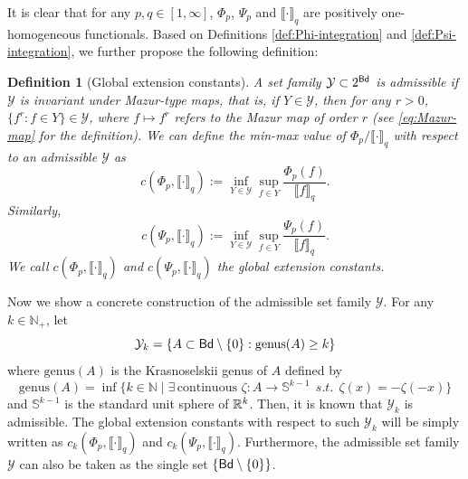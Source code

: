 \documentclass[12pt,a4paper]{article}
\newtheorem{defn}[theorem]{Definition}
\begin{document}
It is clear that for any $p,q\in[1,\infty]$, $\Phi_p$, $\Psi_p$ and $\llbracket \cdot\rrbracket_q$ are  positively one-homogeneous functionals. Based on Definitions \ref{def:Phi-integration} and \ref{def:Psi-integration}, we further propose the following definition: %
\begin{defn}[Global extension constants]
\label{def:global-extension-cons}
A set family $\mathcal{Y}\subset 2^{\sf Bd}$ is \emph{admissible} if $\mathcal{Y}$ is invariant under Mazur-type maps, that is, if $Y\in \mathcal{Y}$, then for any $r>0$, $\{f^r:f\in Y\}\in \mathcal{Y}$, where $f\mapsto f^r$ refers to the Mazur map of order $r$ (see \eqref{eq:Mazur-map} for the definition). 
We can define the %
\emph{min-max value} of $\Phi_p/\llbracket \cdot\rrbracket_q$ with respect to an admissible $\mathcal{Y}$ as 
$$ 
c
(\Phi_p,\llbracket \cdot\rrbracket_q):=\inf\limits_{Y\in \mathcal{Y}}\sup\limits_{f\in Y} \frac{\Phi_p(f)}{\big\llbracket f\big\rrbracket_q}.$$
Similarly, 
$$ 
c
(\Psi_p,\llbracket \cdot\rrbracket_q):=\inf\limits_{Y\in \mathcal{Y}}\sup\limits_{f\in Y} \frac{\Psi_p(f)}{\big\llbracket f\big\rrbracket_q}.$$
We %
call $c
(\Phi_p,\llbracket \cdot\rrbracket_q)$ and $c
(\Psi_p,\llbracket \cdot\rrbracket_q)$ the \emph{global extension constants}.

\end{defn}

Now we show a concrete construction of the admissible set family $\mathcal{Y}$. 
For any $k\in \mathbb{N}_+$, let 
\begin{equation}\label{eq:Y_k}
\mathcal{Y}_k=\{A\subset {\sf Bd}\setminus\{0\}:\mathrm{genus}(A)\ge k\}    
\end{equation}
where $\mathrm{genus}(A)$ is the Krasnoselskii genus of $A$ defined by 
%
\[
\mathrm{genus}(A)=%
\inf\big\{ k\in\mathbb{N}\;|\; \exists\,\text{continuous }\zeta:A\to \mathbb{S}^{k-1}\;\, s.t. \;\, \zeta(x)=-\zeta(-x)\big\rbrace  %
\]
and $\mathbb{S}^{k-1}$ is the standard unit sphere of $\mathbb{R}^k$. Then, it is known that $\mathcal{Y}_k$ is admissible. 
The global extension constants with respect to such $\mathcal{Y}_k$ will be simply written as $c_k
(\Phi_p,\llbracket \cdot\rrbracket_q)$ and $c_k
(\Psi_p,\llbracket \cdot\rrbracket_q)$. 
Furthermore, the admissible set family $\mathcal{Y}$ can also be taken as the single set $\{{\sf Bd}\setminus\{0\}\}$.
\end{document}
